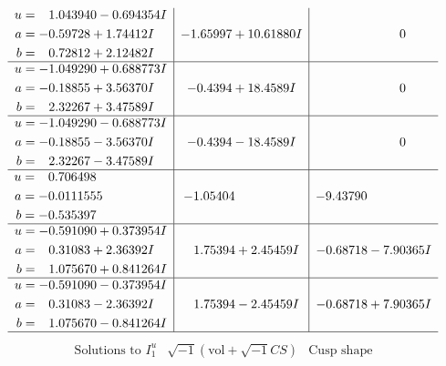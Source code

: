 \documentclass[1p]{elsarticle_modified}
\theoremstyle{definition}
\newcommand{\I}{\sqrt{-1}}
\begin{document}
$$\begin{array}{c|c|c}
\begin{aligned}
u &= \phantom{-}1.043940 - 0.694354 I \\
a &= -0.59728 + 1.74412 I \\
b &= \phantom{-}0.72812 + 2.12482 I\end{aligned}
 & -1.65997 + 10.61880 I & \phantom{-0.000000 } 0 \\ \hline\begin{aligned}
u &= -1.049290 + 0.688773 I \\
a &= -0.18855 + 3.56370 I \\
b &= \phantom{-}2.32267 + 3.47589 I\end{aligned}
 & -0.4394 + 18.4589 I & \phantom{-0.000000 } 0 \\ \hline\begin{aligned}
u &= -1.049290 - 0.688773 I \\
a &= -0.18855 - 3.56370 I \\
b &= \phantom{-}2.32267 - 3.47589 I\end{aligned}
 & -0.4394 - 18.4589 I & \phantom{-0.000000 } 0 \\ \hline\begin{aligned}
u &= \phantom{-}0.706498\phantom{ +0.000000I} \\
a &= -0.0111555\phantom{ +0.000000I} \\
b &= -0.535397\phantom{ +0.000000I}\end{aligned}
 & -1.05404\phantom{ +0.000000I} & -9.43790\phantom{ +0.000000I} \\ \hline\begin{aligned}
u &= -0.591090 + 0.373954 I \\
a &= \phantom{-}0.31083 + 2.36392 I \\
b &= \phantom{-}1.075670 + 0.841264 I\end{aligned}
 & \phantom{-}1.75394 + 2.45459 I & -0.68718 - 7.90365 I \\ \hline\begin{aligned}
u &= -0.591090 - 0.373954 I \\
a &= \phantom{-}0.31083 - 2.36392 I \\
b &= \phantom{-}1.075670 - 0.841264 I\end{aligned}
 & \phantom{-}1.75394 - 2.45459 I & -0.68718 + 7.90365 I\\
 \hline 
 \end{array}$$\newpage$$\begin{array}{c|c|c}  
\text{Solutions to }I^u_{1}& \I (\text{vol} + \sqrt{-1}CS) & \text{Cusp shape}\\
 \hline 
\begin{aligned}

\end{aligned}
\end{array}$$
\end{document}
